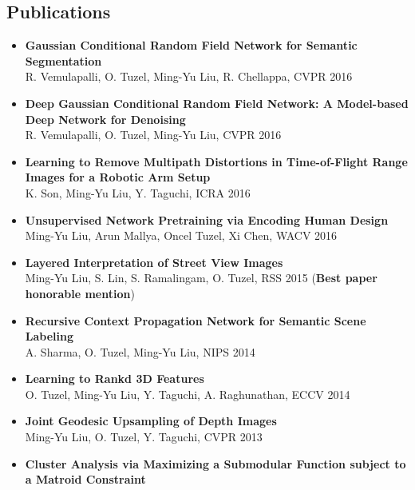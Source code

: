 \documentclass[10pt,letterpaper]{article}
\begin{document}
\subsection*{Publications}
\begin{itemize}
\item {\bf Gaussian Conditional Random Field Network for Semantic Segmentation}\\
      R. Vemulapalli, O. Tuzel, Ming-Yu Liu, R. Chellappa, CVPR 2016\vspace{-2mm}
\item {\bf Deep Gaussian Conditional Random Field Network: A Model-based Deep Network for Denoising}\\
      R. Vemulapalli, O. Tuzel, Ming-Yu Liu, CVPR 2016\vspace{-2mm}
\item {\bf Learning to Remove Multipath Distortions in Time-of-Flight Range Images for a Robotic Arm Setup}\\
      K. Son, Ming-Yu Liu, Y. Taguchi, ICRA 2016\vspace{-2mm}
\item {\bf Unsupervised Network Pretraining via Encoding Human Design}\\
      Ming-Yu Liu, Arun Mallya, Oncel Tuzel, Xi Chen, WACV 2016\vspace{-2mm}
\item {\bf Layered Interpretation of Street View Images}\\
      Ming-Yu Liu, S. Lin, S. Ramalingam, O. Tuzel, RSS 2015 ({\bf Best paper honorable mention})\vspace{-2mm}
\item {\bf Recursive Context Propagation Network for Semantic Scene Labeling}\\
			A. Sharma, O. Tuzel, {Ming-Yu Liu}, {NIPS} 2014\vspace{-2mm}
\item {\bf Learning to Rankd 3D Features}\\
			O. Tuzel, {Ming-Yu Liu}, Y. Taguchi, A. Raghunathan, {ECCV} 2014\vspace{-2mm}
\item {\bf Joint Geodesic Upsampling of Depth Images}\\      
      {Ming-Yu Liu}, O. Tuzel, Y. Taguchi, {CVPR} 2013\vspace{-2mm}
\item {\bf Cluster Analysis via Maximizing a Submodular Function subject to a Matroid Constraint}\\

\end{itemize}
\end{document}
